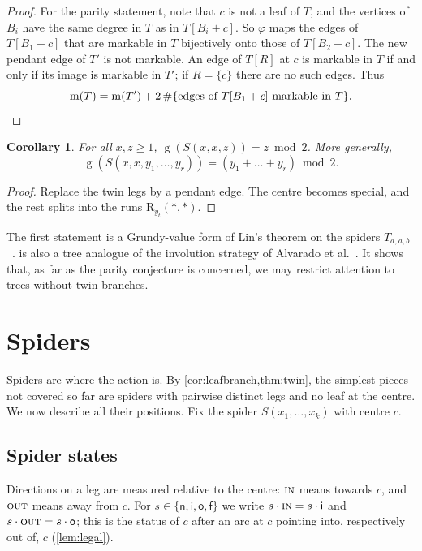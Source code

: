 \documentclass[11pt]{amsart}
\newtheorem{corollary}[theorem]{Corollary}
\theoremstyle{definition}
\theoremstyle{remark}
\newcommand{\gv}{\operatorname{g}}           %
\newcommand{\m}{\operatorname{m}}
\newcommand{\sn}{\mathsf{n}}
\newcommand{\si}{\mathsf{i}}
\newcommand{\so}{\mathsf{o}}
\newcommand{\sff}{\mathsf{f}}
\newcommand{\R}{\mathrm{R}}
\newcommand{\Sp}{S}
\newcommand{\free}{\ast}
\newcommand{\IN}{\textup{\textsc{in}}}
\newcommand{\OUT}{\textup{\textsc{out}}}
\begin{document}
\begin{proof}
For the parity statement, note that $c$ is not a leaf of $T$, and the vertices of $B_i$ have the same degree in $T$ as in $T[B_i+c]$. So $\varphi$ maps the edges of $T[B_1+c]$ that are markable in $T$ bijectively onto those of $T[B_2+c]$. The new pendant edge of $T'$ is not markable. An edge of $T[R]$ at $c$ is markable in $T$ if and only if its image is markable in $T'$; if $R=\{c\}$ there are no such edges. Thus
\[
\m(T)=\m(T')+2\,\#\{\text{edges of } T[B_1+c] \text{ markable in } T\}.\qedhere
\]
\end{proof}

\begin{corollary}\label{cor:twinspider}
For all $x,z\ge1$, $\gv(\Sp(x,x,z))=z\bmod 2$. More generally,
\[\gv(\Sp(x,x,y_1,\dots,y_r))=(y_1+\dots+y_r)\bmod 2.\]
\end{corollary}

\begin{proof}
Replace the twin legs by a pendant edge. The centre becomes special, and the rest splits into the runs $\R_{y_t}(\free,\free)$.
\end{proof}

The first statement is a Grundy-value form of Lin's theorem on the spiders $T_{a,a,b}$~\cite[Theorem~5.3]{Lin2021}.  is also a tree analogue of the involution strategy of Alvarado et al.~\cite{Alvarado2021}. It shows that, as far as the parity conjecture is concerned, we may restrict attention to trees without twin branches.

\section{Spiders}\label{sec:spiders}

Spiders are where the action is. By \cref{cor:leafbranch,thm:twin}, the simplest pieces not covered so far are spiders with pairwise distinct legs and no leaf at the centre. We now describe all their positions. Fix the spider $\Sp(x_1,\dots,x_k)$ with centre $c$.

\subsection{Spider states}
Directions on a leg are measured relative to the centre: $\IN$ means towards $c$, and $\OUT$ means away from $c$. For $s\in\{\sn,\si,\so,\sff\}$ we write $s\cdot\IN=s\cdot\si$ and $s\cdot\OUT=s\cdot\so$; this is the status of $c$ after an arc at $c$ pointing into, respectively out of, $c$ (\cref{lem:legal}).
\end{document}

